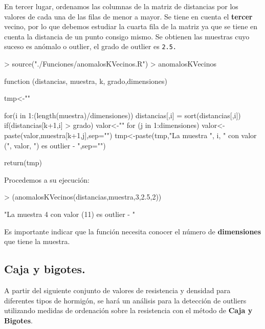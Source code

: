 \documentclass [a4paper] {article}
\begin{document}
\bigskip
En tercer lugar, ordenamos las columnas de la matriz de distancias por los valores de cada una de
las filas de menor a mayor. Se tiene en cuenta el \textbf{tercer} vecino, por lo que debemos estudiar la cuarta 
fila de la matriz ya que se tiene en cuenta la distancia de un punto consigo mismo. Se obtienen las 
muestras cuyo suceso es anómalo o outlier, el grado de outlier es \texttt{2.5.}
\begin{Schunk}
\begin{Sinput}
> source("./Funciones/anomalosKVecinos.R")
> anomalosKVecinos
\end{Sinput}
\begin{Soutput}
function (distancias, muestra, k, grado,dimensiones) {
    tmp<-""

    for(i in 1:(length(muestra)/dimensiones)){
        distancias[,i] = sort(distancias[,i])
        if(distancias[k+1,i] > grado) {
            valor<-""
            for (j in 1:dimensiones){
                valor<-paste(valor,muestra[k+1,j],sep="")
            }
            tmp<-paste(tmp,"La muestra ", i, 
                " con valor (", valor, ") es outlier - ",sep="")
        }
    }

    return(tmp)
}
\end{Soutput}
\end{Schunk}

\bigskip
Procedemos a su ejecución:
\begin{Schunk}
\begin{Sinput}
> (anomalosKVecinos(distancias,muestra,3,2.5,2))
\end{Sinput}
\begin{Soutput}
[1] "La muestra 4 con valor (11) es outlier - "
\end{Soutput}
\end{Schunk}

\bigskip
Es importante indicar que la función necesita conocer el número de \textbf{dimensiones} que tiene
la muestra.

\subsection{Caja y bigotes.}
\bigskip
A partir del siguiente conjunto de valores de resistencia y densidad para diferentes tipos de hormigón,
se hará un análisis para la detección de outliers utilizando medidas de ordenación sobre la resistencia
con el método de \textbf{Caja y Bigotes}.
\end{document}
